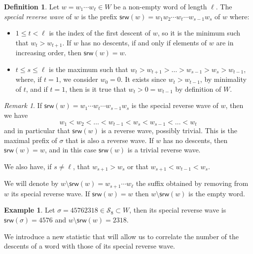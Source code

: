 \documentclass[a4paper]{amsart}
\newcommand{\srw}{\mathsf{srw}}
\theoremstyle{definition}
\newtheorem{definition}[theorem]{Definition}
\newtheorem{example}[theorem]{Example}
\theoremstyle{remark}
\newtheorem{remark}[theorem]{Remark}
\numberwithin{equation}{section}
\begin{document}
\begin{definition}
    \label{def:special_reverse_wave}
    Let $w=w_1\cdots w_{\ell}\in W$ be a non-empty word of length $\ell $. The \textit{special reverse wave} of $w$ is the prefix $\srw(w)=w_1w_{2}\cdots w_t\cdots w_{s-1}w_s$ of $w$ where:
    \begin{itemize}
        \item $1\leq t<\ell$ is the index of the first descent of $w$, so it is the minimum such that $w_t>w_{t+1}$. If $w$ has no descents, if and only if elements of $w$ are in increasing order, then $\srw(w)=w$.
        \item $t\leq s\leq\ell$ is the maximum such that $w_{t}>w_{t+1}>\dots>w_{s-1}>w_s>w_{t-1}$, where, if $t=1$, we consider $w_0=0$. It exists since $w_{t}>w_{t-1}$, by minimality of $t$, and if $t=1$, then is it true that $w_{t}>0=w_{t-1}$ by definition of $W$.
    \end{itemize}  
\end{definition}

\begin{remark}\label{rem:special_reverse_wave}
    If $\srw(w)=w_1\cdots w_t\cdots w_{s-1}w_s$ is the special reverse wave of $w$, then we have 
    \begin{equation}\label{eq:srw_order}
    w_1<w_2<\dots<w_{t-1}<w_s<w_{s-1}<\dots<w_{t}
    \end{equation}
    and in particular that $\srw(w)$ is a reverse wave, possibly trivial. This is the maximal prefix of $\sigma$ that is also a reverse wave.  If $w$ has no descents, then $\srw(w)=w$, and in this case $\srw(w)$ is a trivial reverse wave.
    
    We also have, if $s\neq\ell$, that $w_{s+1}>w_s$ or that $w_{s+1}<w_{t-1}<w_{s}$.
\end{remark}

We will denote by $w\setminus\srw(w)=w_{s+1}\cdots w_{\ell}$ the suffix obtained by removing from $w$ its special reverse wave. If $\srw(w)=w$ then $w\setminus\srw(w)$ is the empty word.

\begin{example}\label{ex_srw}
Let $\sigma=45762318\in \mathcal{S}_8\subset W$, then its special reverse wave is $\srw(\sigma)=4576$ and $w\setminus\srw(w)=2318$.
\end{example}

We introduce a new statistic that will allow us to correlate the number of the descents of a word with those of its special reverse wave.
\end{document}
